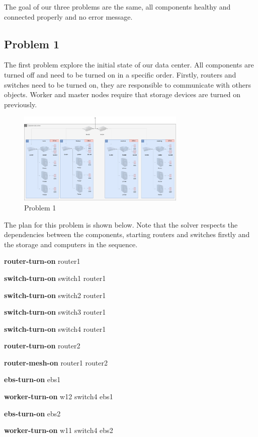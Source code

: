\documentclass[letterpaper]{article}
\begin{document}
The goal of our three problems are the same, all components healthy and connected properly and no error message.

\subsection{Problem 1}\label{sec:experiments1}

The first problem explore the initial state of our data center. All components are turned off and need to be turned on in a specific order. Firstly, routers and switches need to be turned on, they are responsible to communicate with others objects. Worker and master nodes require that storage devices are turned on previously.

\begin{figure}[ht]
    \centering
    \includegraphics[width=8cm]{images/diagrams-pb1.png}
    \caption{Problem 1}
    \label{fig:data-center-pb1}
\end{figure}

The plan for this problem is shown below. Note that the solver respects the dependencies between the components, starting routers and switches firstly and the storage and computers in the sequence.

\textbf{router-turn-on} router1 

\textbf{switch-turn-on} switch1 router1 

\textbf{switch-turn-on} switch2 router1 

\textbf{switch-turn-on} switch3 router1 

\textbf{switch-turn-on} switch4 router1 

\textbf{router-turn-on} router2 

\textbf{router-mesh-on} router1 router2 

\textbf{ebs-turn-on} ebs1 

\textbf{worker-turn-on} w12 switch4 ebs1 

\textbf{ebs-turn-on} ebs2 

\textbf{worker-turn-on} w11 switch4 ebs2 
\end{document}
